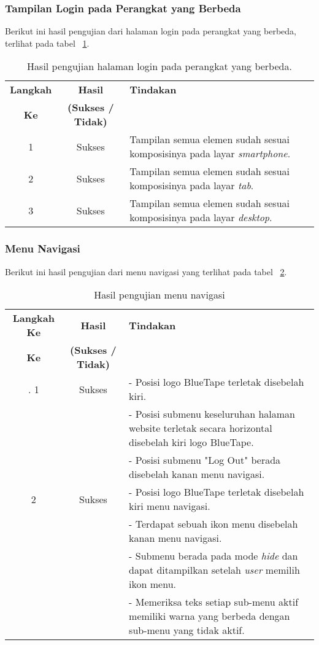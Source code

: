 \subsubsection{Tampilan Login pada Perangkat yang Berbeda}
Berikut ini hasil pengujian dari halaman login pada perangkat yang berbeda, terlihat pada tabel ~\ref{hasil:LoginDevices}.
\begin{table}[H]
	\centering 
	\caption{Hasil pengujian halaman login pada perangkat yang berbeda.}
	\label{hasil:LoginDevices}
	\begin{tabular}{|c|c|p{}|}
		\toprule
		\textbf{Langkah} & \textbf{Hasil} & \textbf{Tindakan}\\
		\textbf{Ke} & \textbf{(Sukses / Tidak)} & \\		
		\midrule
		1 & Sukses & Tampilan semua elemen sudah sesuai komposisinya pada layar \textit{smartphone}.\\
		\hline
		2 & Sukses & Tampilan semua elemen sudah sesuai komposisinya pada layar \textit{tab}.\\
		\hline
		3 & Sukses & Tampilan semua elemen sudah sesuai komposisinya pada layar \textit{desktop}.\\
		\hline
		\bottomrule		
	\end{tabular} 
\end{table}

\subsubsection{Menu Navigasi}
Berikut ini hasil pengujian dari menu navigasi yang terlihat pada tabel ~\ref{hasil:MenuNavigasi}.
\begin{table}[H]
	\centering 
	\caption{Hasil pengujian menu navigasi}
	\label{hasil:MenuNavigasi}
	\begin{tabular}{|c| c| p{}|}
		\toprule
		\textbf{Langkah Ke} & \textbf{Hasil} & \textbf{Tindakan}\\
		\textbf{Ke} & \textbf{(Sukses / Tidak)} &\\
		\midrule.
		1&Sukses& - Posisi logo BlueTape terletak disebelah kiri. \\
		&& - Posisi submenu keseluruhan halaman website terletak secara horizontal disebelah kiri logo BlueTape. \\
		&& - Posisi submenu "Log Out" berada disebelah kanan menu navigasi. \\
		\hline
		2 & Sukses & - Posisi logo BlueTape terletak disebelah kiri menu navigasi. \\
		&& - Terdapat sebuah ikon menu disebelah kanan menu navigasi. \\
		&& - Submenu berada pada mode \textit{hide} dan dapat ditampilkan setelah \textit{user} memilih ikon menu. \\
		&& - Memeriksa teks setiap sub-menu aktif memiliki warna yang berbeda dengan sub-menu yang tidak aktif. \\		
		\bottomrule		
	\end{tabular} 
\end{table}

